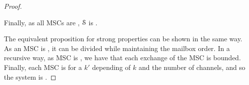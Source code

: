 \begin{proof}
\begin{itemize}
	\end{itemize}
	Finally, as all MSCs are , $\mathcal{S}$ is .

	The equivalent proposition for strong properties can be shown in the same way. As an MSC is \sS, it can be divided while maintaining the mailbox order. In a recursive way, as MSC is , we have that each exchange of the MSC is bounded. Finally, each MSC is  for a $k'$  depending of $k$ and the number of channels, and so the system is .

\end{proof}
